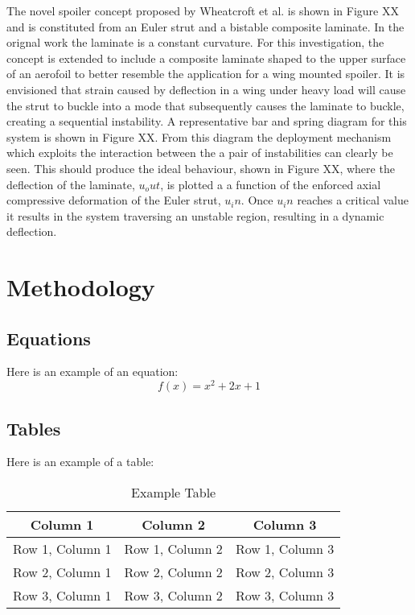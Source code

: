 \documentclass{IEEEtran}
\begin{document}
		The novel spoiler concept proposed by Wheatcroft et al. is shown in Figure XX and is constituted from an Euler strut and a bistable composite laminate. In the orignal work the laminate is a constant curvature. For this investigation, the concept is extended to include a composite laminate shaped to the upper surface of an aerofoil to better resemble the application for a wing mounted spoiler. It is envisioned that strain caused by deflection in a wing under heavy load will cause the strut to buckle into a mode that subsequently causes the laminate to buckle, creating a sequential instability. A representative bar and spring diagram for this system is shown in Figure XX. From this diagram the deployment mechanism which exploits the  interaction between the a pair of instabilities can clearly be seen. This should produce the ideal behaviour, shown in Figure XX, where the deflection of the laminate, $u_out$, is plotted a a function of the enforced axial compressive deformation of the Euler strut, $u_in$. Once $u_in$  reaches a critical value it results in the system traversing an unstable region, resulting in a dynamic deflection.

	\section{Methodology}
	
	
	\subsection{Equations}
	Here is an example of an equation:
	\begin{equation}
		f(x) = x^2 + 2x + 1
	\end{equation}
	
	\subsection{Tables}
	Here is an example of a table:
	\begin{table}[htbp]
		\centering
		\caption{Example Table}
		\label{tab:example}
		\begin{tabular}{|c|c|c|}
			\hline
			\textbf{Column 1} & \textbf{Column 2} & \textbf{Column 3} \\
			\hline
			Row 1, Column 1 & Row 1, Column 2 & Row 1, Column 3 \\
			\hline
			Row 2, Column 1 & Row 2, Column 2 & Row 2, Column 3 \\
			\hline
			Row 3, Column 1 & Row 3, Column 2 & Row 3, Column 3 \\
			\hline
		\end{tabular}
	\end{table}
	
\end{document}
